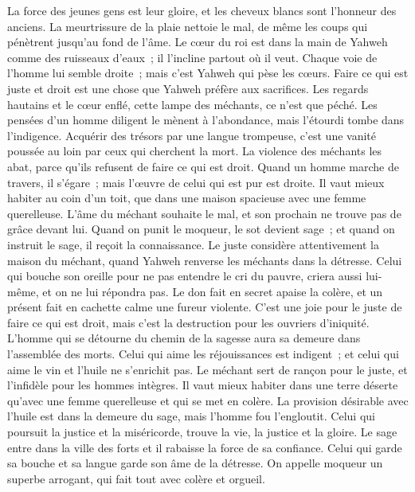 \begin{multicols}{2}
La force des jeunes gens est leur gloire, et les cheveux blancs sont l'honneur des anciens.
La meurtrissure de la plaie nettoie le mal, de même les coups qui pénètrent jusqu'au fond de l'âme.
\VerseOne{}Le cœur du roi est dans la main de Yahweh comme des ruisseaux d'eaux~; il l'incline partout où il veut.
Chaque voie de l'homme lui semble droite~; mais c'est Yahweh qui pèse les cœurs.
Faire ce qui est juste et droit est une chose que Yahweh préfère aux sacrifices.
Les regards hautains et le cœur enflé, cette lampe des méchants, ce n'est que péché.
Les pensées d'un homme diligent le mènent à l'abondance, mais l'étourdi tombe dans l'indigence.
Acquérir des trésors par une langue trompeuse, c'est une vanité poussée au loin par ceux qui cherchent la mort.
La violence des méchants les abat, parce qu'ils refusent de faire ce qui est droit.
Quand un homme marche de travers, il s'égare~; mais l'œuvre de celui qui est pur est droite.
Il vaut mieux habiter au coin d'un toit, que dans une maison spacieuse avec une femme querelleuse.
L'âme du méchant souhaite le mal, et son prochain ne trouve pas de grâce devant lui.
Quand on punit le moqueur, le sot devient sage~; et quand on instruit le sage, il reçoit la connaissance.
Le juste considère attentivement la maison du méchant, quand Yahweh renverse les méchants dans la détresse.
Celui qui bouche son oreille pour ne pas entendre le cri du pauvre, criera aussi lui-même, et on ne lui répondra pas.
Le don fait en secret apaise la colère, et un présent fait en cachette calme une fureur violente.
C'est une joie pour le juste de faire ce qui est droit, mais c'est la destruction pour les ouvriers d'iniquité.
L'homme qui se détourne du chemin de la sagesse aura sa demeure dans l'assemblée des morts.
Celui qui aime les réjouissances est indigent~; et celui qui aime le vin et l'huile ne s'enrichit pas.
Le méchant sert de rançon pour le juste, et l'infidèle pour les hommes intègres.
Il vaut mieux habiter dans une terre déserte qu'avec une femme querelleuse et qui se met en colère.
La provision désirable avec l'huile est dans la demeure du sage, mais l'homme fou l'engloutit.
Celui qui poursuit la justice et la miséricorde, trouve la vie, la justice et la gloire.
Le sage entre dans la ville des forts et il rabaisse la force de sa confiance.
Celui qui garde sa bouche et sa langue garde son âme de la détresse.
On appelle moqueur un superbe arrogant, qui fait tout avec colère et orgueil.

\end{multicols}
